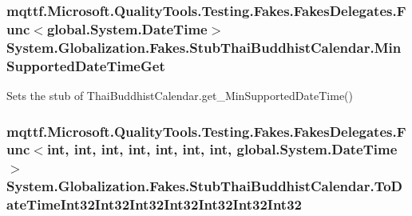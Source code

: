 \hypertarget{class_system_1_1_globalization_1_1_fakes_1_1_stub_thai_buddhist_calendar_a5ec14abdf230698a2366e0c4974d7ac8}{
\subsubsection[{Min\-Supported\-Date\-Time\-Get}]{\setlength{\rightskip}{0pt plus 5cm}mqttf.\-Microsoft.\-Quality\-Tools.\-Testing.\-Fakes.\-Fakes\-Delegates.\-Func$<$global.\-System.\-Date\-Time$>$ System.\-Globalization.\-Fakes.\-Stub\-Thai\-Buddhist\-Calendar.\-Min\-Supported\-Date\-Time\-Get}}\label{class_system_1_1_globalization_1_1_fakes_1_1_stub_thai_buddhist_calendar_a5ec14abdf230698a2366e0c4974d7ac8}


Sets the stub of Thai\-Buddhist\-Calendar.\-get\-\_\-\-Min\-Supported\-Date\-Time()

\hypertarget{class_system_1_1_globalization_1_1_fakes_1_1_stub_thai_buddhist_calendar_a2665b8befef1aea17df3a35ac51f6ea5}{
\subsubsection[{To\-Date\-Time\-Int32\-Int32\-Int32\-Int32\-Int32\-Int32\-Int32}]{\setlength{\rightskip}{0pt plus 5cm}mqttf.\-Microsoft.\-Quality\-Tools.\-Testing.\-Fakes.\-Fakes\-Delegates.\-Func$<$int, int, int, int, int, int, int, global.\-System.\-Date\-Time$>$ System.\-Globalization.\-Fakes.\-Stub\-Thai\-Buddhist\-Calendar.\-To\-Date\-Time\-Int32\-Int32\-Int32\-Int32\-Int32\-Int32\-Int32}}\label{class_system_1_1_globalization_1_1_fakes_1_1_stub_thai_buddhist_calendar_a2665b8befef1aea17df3a35ac51f6ea5}


